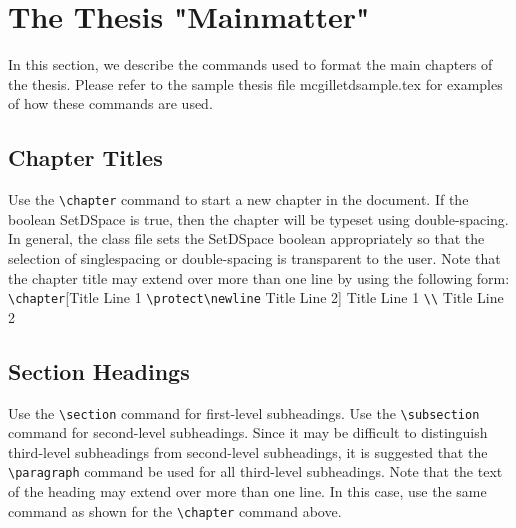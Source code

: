 \documentclass[12pt,Bold,letterpaper,TexShade]{mcgilletdclass}
\begin{document}
\chapter{The Thesis "Mainmatter"}
In this section, we describe the commands used to format the
main chapters of the thesis. Please refer to the sample thesis file
mcgilletdsample.tex for examples of how these commands are used.
\section{Chapter Titles}
Use the \verb=\chapter= command to start a new chapter in the document. If 
the boolean SetDSpace is true, then the chapter will
be typeset using double-spacing. In general, the class file sets the
SetDSpace boolean appropriately so that the selection of singlespacing
or double-spacing is transparent to the user.
Note that the chapter title may extend over more than one line
by using the following form:
\verb=\chapter=[Title Line 1 \verb=\protect\newline= Title Line 2]{%
Title Line 1 \verb=\\= Title Line 2}%
\section{Section Headings}
Use the \verb=\section= command for first-level subheadings. Use the 
\verb=\subsection= command for second-level subheadings. Since it
may be difficult to distinguish third-level subheadings from second-level
subheadings, it is suggested that the \verb=\paragraph= command be
used for all third-level subheadings. Note that the text of the heading
may extend over more than one line. In this case, use the same command
as shown for the \verb=\chapter= command above.
\end{document}
